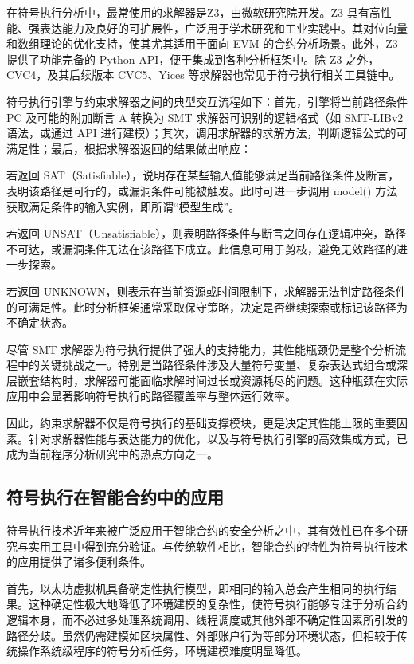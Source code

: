 \documentclass[print, master, vlined, timesmath]{DissertUESTC}
\begin{document}
在符号执行分析中，最常使用的求解器是Z3，由微软研究院开发。Z3 具有高性能、强表达能力及良好的可扩展性，广泛用于学术研究和工业实践中。其对位向量和数组理论的优化支持，使其尤其适用于面向 EVM 的合约分析场景。此外，Z3 提供了功能完备的 Python API，便于集成到各种分析框架中。除 Z3 之外，CVC4，及其后续版本 CVC5、Yices 等求解器也常见于符号执行相关工具链中。

符号执行引擎与约束求解器之间的典型交互流程如下：首先，引擎将当前路径条件 PC 及可能的附加断言 A 转换为 SMT 求解器可识别的逻辑格式（如 SMT-LIBv2 语法，或通过 API 进行建模）；其次，调用求解器的求解方法，判断逻辑公式的可满足性；最后，根据求解器返回的结果做出响应：

若返回 SAT（Satisfiable），说明存在某些输入值能够满足当前路径条件及断言，表明该路径是可行的，或漏洞条件可能被触发。此时可进一步调用 model() 方法获取满足条件的输入实例，即所谓“模型生成”。

若返回 UNSAT（Unsatisfiable），则表明路径条件与断言之间存在逻辑冲突，路径不可达，或漏洞条件无法在该路径下成立。此信息可用于剪枝，避免无效路径的进一步探索。

若返回 UNKNOWN，则表示在当前资源或时间限制下，求解器无法判定路径条件的可满足性。此时分析框架通常采取保守策略，决定是否继续探索或标记该路径为不确定状态。

尽管 SMT 求解器为符号执行提供了强大的支持能力，其性能瓶颈仍是整个分析流程中的关键挑战之一。特别是当路径条件涉及大量符号变量、复杂表达式组合或深层嵌套结构时，求解器可能面临求解时间过长或资源耗尽的问题。这种瓶颈在实际应用中会显著影响符号执行的路径覆盖率与整体运行效率。

因此，约束求解器不仅是符号执行的基础支撑模块，更是决定其性能上限的重要因素。针对求解器性能与表达能力的优化，以及与符号执行引擎的高效集成方式，已成为当前程序分析研究中的热点方向之一。

\subsection{符号执行在智能合约中的应用}

符号执行技术近年来被广泛应用于智能合约的安全分析之中，其有效性已在多个研究与实用工具中得到充分验证。与传统软件相比，智能合约的特性为符号执行技术的应用提供了诸多便利条件。

首先，以太坊虚拟机具备确定性执行模型，即相同的输入总会产生相同的执行结果。这种确定性极大地降低了环境建模的复杂性，使符号执行能够专注于分析合约逻辑本身，而不必过多处理系统调用、线程调度或其他外部不确定性因素所引发的路径分歧。虽然仍需建模如区块属性、外部账户行为等部分环境状态，但相较于传统操作系统级程序的符号分析任务，环境建模难度明显降低。
\end{document}
